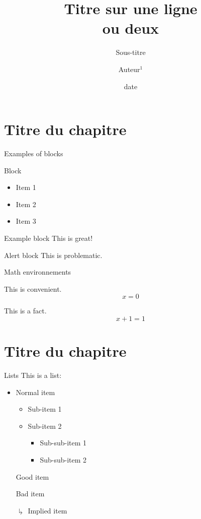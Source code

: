 \documentclass[slideopt,A4,showboxes,svgnames]{beamer}
\title[titrecourt]{Titre sur une ligne\\ ou deux}
\subtitle{Sous-titre}
\date[date]{date}
\author[Auteur]{Auteur$^1$}
\institute{$^1$ Affiliation}
\begin{document}
\begin{frame}
    \titlepage
\end{frame}


\frame{\tocpage}
 
\section{Titre du chapitre}
\frame{\sectionpage}

\begin{frame}{Examples of blocks}
\begin{block}{Block}
\begin{itemize}
\item{Item 1}
\item{Item 2}
\item{Item 3}
\end{itemize}
\end{block}
\begin{exampleblock}{Example block}
This is great!
\end{exampleblock}
\begin{alertblock}{Alert block}
This is problematic.
\end{alertblock}

\end{frame}

\begin{frame}{Math environnements}
\begin{assumption}
	This is convenient.
	\[x = 0\]
\end{assumption}
\begin{theorem}
	This is a fact.
	\[x + 1 = 1\]
\end{theorem}
\end{frame}


\section{Titre du chapitre}
 \frame{\sectionpage}

\begin{frame}{Lists}
This is a list:
\begin{itemize}
	\item Normal item
	\begin{itemize}
		\item {Sub-item 1}
		\item {Sub-item 2}
		\begin{itemize}
			\item {Sub-sub-item 1}
			\item {Sub-sub-item 2}
		\end{itemize}
	\end{itemize}
	\item[\green \checkmark]{Good item}
	\item[\red \xmark]{Bad item}
	\item[\red $\drsh$]{Implied item}
\end{itemize}
\end{frame}
\end{document}
